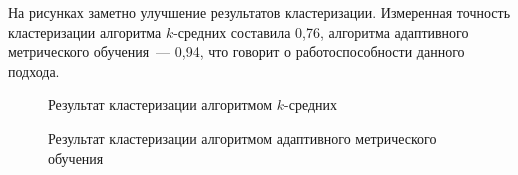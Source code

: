 На рисунках заметно улучшение результатов кластеризации.
Измеренная точность кластеризации алгоритма $k$-средних составила 0,76,
алгоритма адаптивного метрического обучения~--- 0,94, что говорит о работоспособности данного подхода.
\begin{figure} %
    \caption{Результат кластеризации алгоритмом $k$-средних}
\end{figure}
\begin{figure} %
    \caption{Результат кластеризации алгоритмом адаптивного метрического обучения}
\end{figure}


